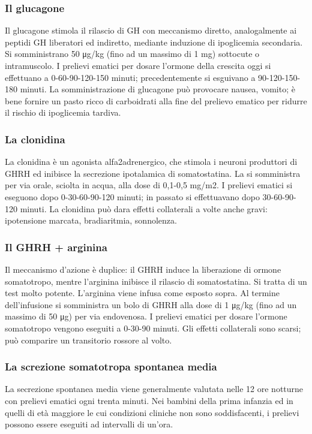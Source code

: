 \subsubsection*{Il glucagone}
Il glucagone stimola il rilascio di GH con meccanismo diretto, analogalmente ai peptidi GH liberatori ed indiretto, mediante induzione di ipoglicemia secondaria. Si somministrano 50 \unit{\micro g}/kg (fino ad un massimo di 1 mg) sottocute o intramuscolo. I prelievi ematici per dosare l'ormone della crescita oggi si effettuano a 0-60-90-120-150 minuti; precedentemente si esguivano a 90-120-150-180 minuti. La somministrazione di glucagone può provocare nausea, vomito; è bene fornire un pasto ricco di carboidrati alla fine del prelievo ematico per ridurre il rischio di ipoglicemia tardiva.

\subsubsection*{La clonidina}
La clonidina è un agonista alfa2adrenergico, che stimola i neuroni produttori di GHRH ed inibisce la secrezione ipotalamica di somatostatina. La si somministra per via orale, sciolta in acqua, alla dose di 0,1-0,5 mg/m2. I prelievi ematici si eseguono dopo 0-30-60-90-120 minuti; in passato si effettuavano dopo 30-60-90-120 minuti. La clonidina può dara effetti collaterali a volte anche gravi: ipotensione marcata, bradiaritmia, sonnolenza.
 
\subsubsection*{Il GHRH + arginina}
Il meccanismo d'azione è duplice: il GHRH induce la liberazione di ormone somatotropo, mentre l'arginina inibisce il rilascio di somatostatina. Si tratta di un test molto potente. L'arginina viene infusa come esposto sopra. Al termine dell'infusione si somministra un bolo di GHRH alla dose di 1 \unit{\micro g}/kg (fino ad un massimo di 50 \unit{\micro g}) per via endovenosa. I prelievi ematici per dosare l'ormone somatotropo vengono eseguiti a 0-30-90 minuti. Gli effetti collaterali sono scarsi; può comparire un transitorio rossore al volto.

\subsubsection*{La screzione somatotropa spontanea media}
La secrezione spontanea media viene generalmente valutata nelle 12 ore notturne con prelievi ematici ogni trenta minuti. Nei bambini della prima infanzia ed in quelli di età maggiore le cui condizioni cliniche non sono soddisfacenti, i prelievi possono essere eseguiti ad intervalli di un'ora.

